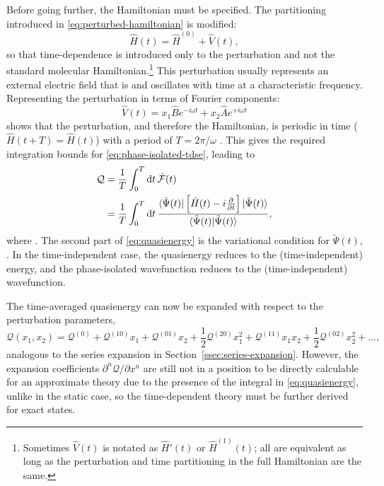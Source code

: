 \documentclass[%
class = book,%
crop = false,%
float = true,%
multi = true,%
preview = false,%
]{standalone}
\begin{document}
Before going further, the Hamiltonian must be specified. The partitioning introduced in \eqref{eq:perturbed-hamiltonian} is modified:
\begin{equation}
  \label{eq:perturbed-hamiltonian-time-dependent}
  \hat{H}(t) = \hat{H}^{(0)} + \hat{V}(t),
\end{equation}
so that time-dependence is introduced only to the perturbation and not the standard molecular Hamiltonian.\footnote{Sometimes \(\hat{V}(t)\) is notated as \(\hat{H}'(t)\) or \(\hat{H}^{(1)}(t)\); all are equivalent as long as the perturbation and time partitioning in the full Hamiltonian are the same.} This perturbation usually represents an external electric field that is   and oscillates with time at a characteristic frequency. Representing the perturbation in terms of Fourier components:
\begin{equation}
  \label{eq:fourier-components}
  \hat{V}(t) = x_{1} \hat{B} e^{-i\omega t} + x_{2} \hat{A} e^{+i\omega t}
\end{equation} %
shows that the perturbation, and therefore the Hamiltonian, is periodic in time (\(\hat{H}(t + T) = \hat{H}(t)\)) with a period of \(T = 2\pi/\omega\) . This gives the required integration bounds for \eqref{eq:phase-isolated-tdse}, leading to
\begin{equation}
  \label{eq:quasienergy}
  \begin{aligned}
    \mathcal{Q} &= \frac{1}{T} \int_{0}^{T} \mathrm{d}t \, \dot{\mathcal{F}}(t) \\
    &= \frac{1}{T} \int_{0}^{T} \mathrm{d}t \, \frac{\bra{\tilde{\Psi}(t)} \left[ \hat{H}(t) - i\frac{\partial}{\partial t} \right] \ket{\tilde{\Psi}(t)}}{\braket{\tilde{\Psi}(t)|\tilde{\Psi}(t)}},
  \end{aligned}
\end{equation}
where . The second part of \eqref{eq:quasienergy} is the variational condition for \(\tilde{\Psi}(t)\), . In the time-independent case, the quasienergy reduces to the (time-independent) energy, and the phase-isolated wavefunction reduces to the (time-independent) wavefunction.

The time-averaged quasienergy can now be expanded with respect to the perturbation parameters,
\begin{equation}
  \label{eq:quasienergy-expansion}
  \mathcal{Q}(x_{1},x_{2}) = \mathcal{Q}^{(0)} + \mathcal{Q}^{(10)}x_{1} + \mathcal{Q}^{(01)}x_{2} + \frac{1}{2}\mathcal{Q}^{(20)}x_{1}^{2} + \mathcal{Q}^{(11)}x_{1}x_{2} + \frac{1}{2}\mathcal{Q}^{(02)}x_{2}^{2} + \dots,
\end{equation}
analogous to the series expansion in Section~\ref{ssec:series-expansion}. However, the expansion coefficients \(\partial^{n}\mathcal{Q}/\partial x^{n}\) are still not in a position to be directly calculable for an approximate theory due to the presence of the integral in \eqref{eq:quasienergy}, unlike in the static case, so the time-dependent theory must be further derived for exact states.
\end{document}
